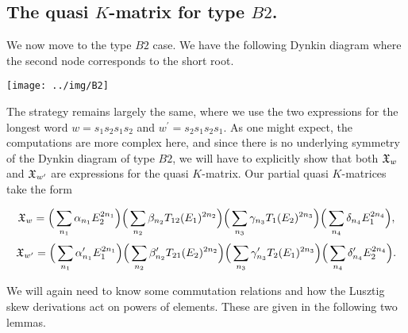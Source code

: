 \documentclass[a4 paper, 10pt]{article}
\begin{document}
\subsection{The quasi $K$-matrix for type $B2$.}
We now move to the type $B2$ case. We have the following Dynkin diagram where the second node corresponds to the short root. 

\begin{center}
\texttt{[image: ../img/B2]}
\end{center}

The strategy remains largely the same, where we use the two expressions for the longest word $w = s_1s_2s_1s_2$ and $w^{\prime} = s_2s_1s_2s_1$. As one might expect, the computations are more complex here, and since there is no underlying symmetry of the Dynkin diagram of type $B2$, we will have to explicitly show that both $\mathfrak{X}_w$ and $\mathfrak{X}_{w^{\prime}}$ are expressions for the quasi $K$-matrix. Our partial quasi $K$-matrices take the form

	\begin{equation} \label{eq:B2Qkm1}
		\mathfrak{X}_{w} = \Big( \sum_{n_1} \alpha_{n_1} E_2^{2n_1} \Big)	 \Big( \sum_{n_2} \beta_{n_2} T_{12}(E_1)^{2n_2} \Big) 
			\Big( \sum_{n_3} \gamma_{n_3} T_{1}(E_2)^{2n_3} \Big) 	\Big( \sum_{n_4} \delta_{n_4} E_1^{2n_4} \Big),
	\end{equation}
	\vspace{10pt}
	\begin{equation} \label{eq:B2Qkm2}
		\mathfrak{X}_{w^{\prime}} = \Big( \sum_{n_1} \alpha_{n_1}^{\prime} E_1^{2n_1} \Big)	 \Big( \sum_{n_2} \beta_{n_2}^{\prime} T_{21}(E_2)^{2n_2} \Big) 
			\Big( \sum_{n_3} \gamma_{n_3}^{\prime} T_{2}(E_1)^{2n_3} \Big) 	\Big( \sum_{n_4} \delta_{n_4}^{\prime} E_2^{2n_4} \Big).
	\end{equation}
	\vspace{5pt}
	
We will again need to know some commutation relations and how the Lusztig skew derivations act on powers of elements. These are given in the following two lemmas.
\end{document}
